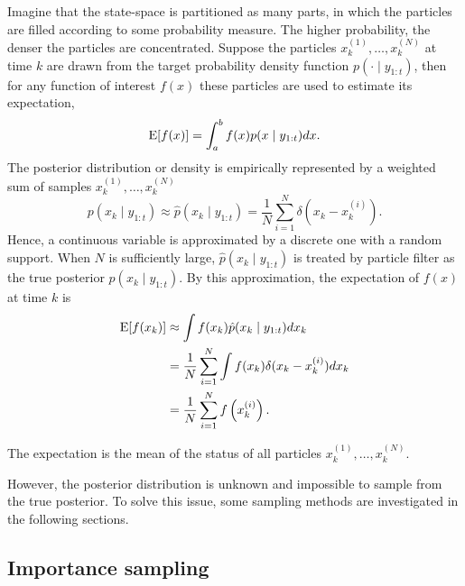 Imagine that the state-space is partitioned as many parts, in which the particles are filled according to some probability measure. The higher probability, the denser the particles are concentrated. Suppose the particles $x_k^{(1)}, \ldots, x_k^{(N)}$ at time $k$ are drawn from the target probability density function $p(\cdot\mid y_{1:t})$, then for any function of interest $f(x)$ these particles are used to estimate its expectation,
\begin{equation}
\mathrm{E}\lbrack f(x) \rbrack = \int_a^bf(x)p(x\mid y_{1:t})dx.
\end{equation}
The posterior distribution or density is empirically represented by a weighted sum of samples $x_k^{(1)}, \ldots, x_k^{(N)}$  
\begin{equation}\label{rawParticleFilter}
p(x_k\mid y_{1:t})\approx\hat{p}(x_k\mid y_{1:t})=\frac{1}{N}\sum_{i=1}^N\delta \left(x_k-x_k^{(i)}\right) .
\end{equation}
Hence, a continuous variable is approximated by a discrete one with a random support. When $N$ is sufficiently large, $\hat{p}(x_k\mid y_{1:t})$ is treated by particle filter as the true posterior $p(x_k\mid y_{1:t})$. By this approximation, the expectation of $f(x)$ at time $k$ is 
\begin{equation}
\begin{split}
\mathrm{E}\lbrack f(x_k)\rbrack &\approx \int f(x_k)\hat{p}(x_k\mid y_{1:t})dx_k \\
 & =\frac{1}{N} \sum_{i=1}^N\int f(x_k) \delta (x_k-x_k^{(i)}) dx_k\\
 & = \frac{1}{N}\sum_{i=1}^Nf\left(x_k^{(i)}\right).
\end{split}
\end{equation}

The expectation is the mean of the status of all particles $x_k^{(1)}, \ldots, x_k^{(N)}$.  

However, the posterior distribution is unknown and impossible to sample from the true posterior. To solve this issue, some sampling methods are investigated in the following sections.


\subsection{Importance sampling}

